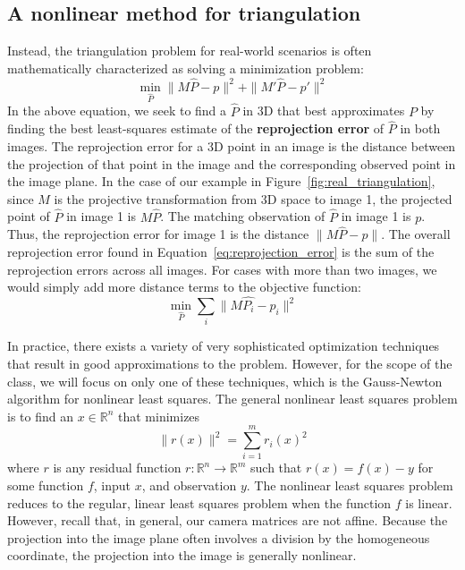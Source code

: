 \documentclass[a4paper, 12pt]{article}
\renewcommand\emph{\textbf}
\numberwithin{equation}{section}
\begin{document}
\subsection{A nonlinear method for triangulation}
Instead, the triangulation problem for real-world scenarios is often mathematically characterized as solving a minimization problem:
\begin{equation}
    \min_{\hat{P}} \|M\hat{P}-p\|^2 + \|M'\hat{P}-p'\|^2
    \label{eq:reprojection_error}
\end{equation}
In the above equation, we seek to find a $\hat{P}$ in 3D that best approximates $P$ by finding the best least-squares estimate of the \emph{reprojection error} of $\hat{P}$ in both images. The reprojection error for a 3D point in an image is the distance between the projection of that point in the image  and the corresponding observed point in the image plane. In the case of our example in Figure~\ref{fig:real_triangulation}, since $M$ is the projective transformation from 3D space to image 1, the projected point of $\hat{P}$ in image 1 is $M\hat{P}$. The matching observation of $\hat{P}$ in image 1 is $p$. Thus, the reprojection error for image 1 is the distance $\|M\hat{P} - p\|$. The overall reprojection error found in Equation~\ref{eq:reprojection_error} is the sum of the reprojection errors across all images. For cases with more than two images, we would simply add more distance terms to the objective function:
\begin{equation}
    \min_{\hat{P}} \sum_i \|M\hat{P_i}-p_i\|^2
    \label{eq:reprojection_error_multi_camera}
\end{equation}

In practice, there exists a variety of very sophisticated optimization techniques that result in good approximations to the problem. However, for the scope of the class, we will focus on only one of these techniques, which is the Gauss-Newton algorithm for nonlinear least squares. The general nonlinear least squares problem is to find an $x\in \mathbb{R}^n$ that minimizes
\begin{equation}
    \|r(x)\|^2 = \sum_{i=1}^m r_i(x)^2
\end{equation}
where $r$ is any residual function $r:\mathbb{R}^n\rightarrow \mathbb{R}^m$ such that $r(x) = f(x) - y$ for some function $f$, input $x$, and observation $y$. The nonlinear least squares problem reduces to the regular, linear least squares problem when the function $f$ is linear. However, recall that, in general, our camera matrices are not affine. Because the projection into the image plane often involves a division by the homogeneous coordinate, the projection into the image is generally nonlinear.
\end{document}
